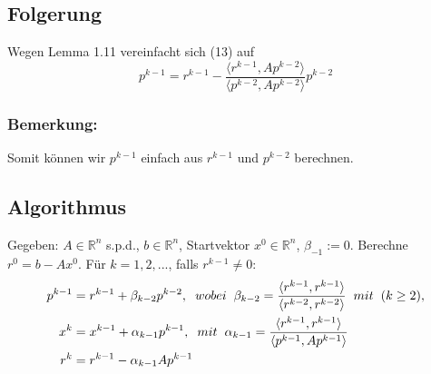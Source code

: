 \documentclass{article}
\begin{document}
\subsection{Folgerung}
Wegen Lemma 1.11 vereinfacht sich (13) auf
\begin{equation*}
p^{k-1} = r^{k-1} - \frac {\langle r^{k-1}, Ap^{k-2} \rangle} {\langle p^{k-2}, Ap^{k-2} \rangle} p^{k-2}
\end{equation*}

\subsubsection{Bemerkung:}
Somit können wir $p^{k-1}$ einfach aus $r^{k-1}$ und $p^{k-2}$ berechnen.

\subsection{Algorithmus}
Gegeben: $A \in \mathbb{R}^{n}$ s.p.d., $b \in \mathbb{R}^{n}$, Startvektor $x^{0} \in \mathbb{R}^{n}$, $\beta_{-1} := 0$. Berechne $r^{0} = b - Ax^{0}$. Für $k = 1,2,...$, falls $r^{k-1} \ne 0$:
\begin{subequations}
\begin{align}
	p^{k-1} &= r^{k-1} + \beta_{k-2}p^{k-2}, \hspace{2mm} wobei \hspace{2mm} \beta_{k-2} = \frac {\langle r^{k-1}, r^{k-1} \rangle} {\langle r^{k-2}, r^{k-2} \rangle} \hspace{2mm} mit \hspace{2mm} (k \ge 2),\\
	x^{k} &= x^{k-1} + \alpha_{k-1}p^{k-1}, \hspace{2mm} mit \hspace{2mm} \alpha_{k-1} = \frac {\langle r^{k-1}, r^{k-1} \rangle} {\langle p^{k-1}, Ap^{k-1} \rangle}\\
	r^{k} &= r^{k-1} - \alpha_{k-1}Ap^{k-1}
\end{align}
\end{subequations}
\end{document}
